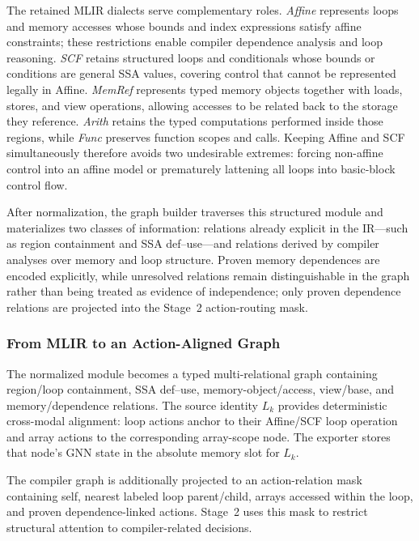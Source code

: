 The retained MLIR dialects serve complementary roles. \emph{Affine} represents loops and memory accesses whose bounds and index expressions satisfy affine
constraints; these restrictions enable compiler dependence analysis and loop reasoning. \emph{SCF} retains structured loops and conditionals whose
bounds or conditions are general SSA values, covering control that cannot be represented legally in Affine. \emph{MemRef} represents typed memory objects together with loads, stores, and view operations, allowing accesses to be related back to the storage they reference. \emph{Arith} retains the typed computations performed inside those regions, while \emph{Func} preserves function scopes and calls. Keeping Affine and SCF simultaneously therefore avoids two undesirable extremes: forcing non-affine control into an affine model or prematurely lattening all loops into basic-block control flow.

After normalization, the graph builder traverses this structured module and materializes two classes of information: relations already explicit in the IR---such as region containment and SSA def--use---and relations derived by compiler analyses over memory and loop structure. 
Proven memory dependences are encoded explicitly, while unresolved relations remain distinguishable in the graph rather than being treated as evidence of independence; only proven dependence relations are
projected into the Stage~2 action-routing mask.



\subsubsection{From MLIR to an Action-Aligned Graph}
\label{subsubsec:graph-construction}

The normalized module becomes a typed multi-relational graph containing region/loop containment, SSA def--use, memory-object/access, view/base,
and memory/dependence relations. The source identity $L_k$ provides deterministic cross-modal alignment: loop actions anchor to their Affine/SCF loop operation and array actions to the corresponding
array-scope node. The exporter stores that node's GNN state in the absolute memory slot for $L_k$.

The compiler graph is additionally projected to an action-relation mask containing self, nearest labeled loop parent/child, arrays accessed within the loop, and proven dependence-linked actions.
Stage~2 uses this mask to restrict structural attention to compiler-related decisions.

